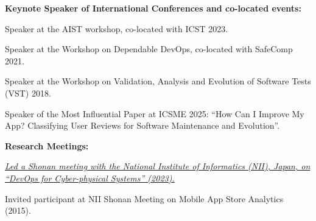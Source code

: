 \documentclass[11pt]{article}
\begin{document}
\medskip 

\textbf{Keynote Speaker of International Conferences and co-located events:}
\begin{innerlist}
\item Speaker at the AIST workshop, co-located with ICST 2023.
\item Speaker at the Workshop on Dependable DevOps, co-located with SafeComp 2021.
\item Speaker at the Workshop on Validation, Analysis and Evolution of Software Tests (VST) 2018.
\item Speaker of the Most Influential Paper at ICSME 2025: ``How Can I Improve My App? Classifying User Reviews for Software Maintenance and Evolution''.
\end{innerlist}

\medskip 

\textbf{Research Meetings:}
\begin{innerlist}
   \item \emph{\href{https://shonan.nii.ac.jp/seminars/204/}{Led a Shonan meeting with the National Institute of Informatics (NII), Japan, on ``DevOps for Cyber-physical Systems'' (2023).}}
   \item Invited participant at NII Shonan Meeting on Mobile App Store Analytics (2015).
\end{innerlist}
\end{document}

